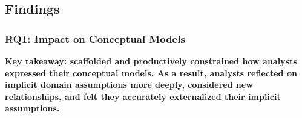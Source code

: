 \begin{comment}

\subsubsection{\evalStatisticalModels}
We used AIC, BIC, and R-squared values to assess how well statistical models
authored with vs. without rTisane fit the data. We used rTisane to statistically
model and assess the influence of rTisane on AIC, BIC, and R-squared values.

We also thematically analyzed participants' reactions to the similarities,
differences, and surprises between statistical models. 

\end{comment}

\subsection{Findings}
\subsubsection{RQ1: \rTisanes Impact on Conceptual Models}
\conceptualModelsScaffold

\textbf{Key takeaway: \rTisane scaffolded and productively constrained how analysts expressed
their conceptual models. As a result, analysts reflected on implicit domain
assumptions more deeply, considered new relationships, and felt they
accurately externalized their implicit assumptions.}

